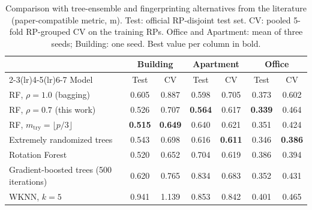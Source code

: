 \begin{table}[!t]
\centering
\caption{Comparison with tree-ensemble and fingerprinting alternatives from the literature (paper-compatible metric, m). Test: official RP-disjoint test set. CV: pooled 5-fold RP-grouped CV on the training RPs. Office and Apartment: mean of three seeds; Building: one seed. Best value per column in bold.}
\label{tab:literature_baselines}
\footnotesize
\setlength{\tabcolsep}{4pt}
\begin{tabular}{lcccccc}
\toprule
 & \multicolumn{2}{c}{Building} & \multicolumn{2}{c}{Apartment} & \multicolumn{2}{c}{Office} \\
\cmidrule(lr){2-3}\cmidrule(lr){4-5}\cmidrule(lr){6-7}
Model & Test & CV & Test & CV & Test & CV \\
\midrule
RF, $\rho=1.0$ (bagging) \cite{feng2026robust} & 0.605 & 0.887 & 0.598 & 0.705 & 0.373 & 0.602 \\
RF, $\rho=0.7$ (this work) & 0.526 & 0.707 & \textbf{0.564} & 0.617 & \textbf{0.339} & 0.464 \\
RF, $m_{\mathrm{try}}=\lfloor p/3\rfloor$ \cite{breiman2001random} & \textbf{0.515} & \textbf{0.649} & 0.640 & 0.621 & 0.351 & 0.424 \\
Extremely randomized trees \cite{geurts2006extremely} & 0.543 & 0.698 & 0.616 & \textbf{0.611} & 0.346 & \textbf{0.386} \\
Rotation Forest \cite{rodriguez2006rotation} & 0.520 & 0.652 & 0.704 & 0.619 & 0.386 & 0.394 \\
Gradient-boosted trees (500 iterations) & 0.620 & 0.765 & 0.834 & 0.683 & 0.352 & 0.431 \\
WKNN, $k=5$ \cite{bahl2000radar} & 0.941 & 1.139 & 0.853 & 0.842 & 0.401 & 0.465 \\
\bottomrule
\end{tabular}
\end{table}
